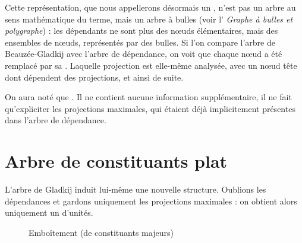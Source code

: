 Cette représentation, que nous appellerons désormais un , n’est pas un arbre au sens mathématique du terme, mais un arbre à bulles (voir l’ \textit{Graphe à bulles et polygraphe}) : les dépendants ne sont plus des nœuds élémentaires, mais des ensembles de nœuds, représentés par des bulles. Si l’on compare l’arbre de Beauzée-Gladkij avec l’arbre de dépendance, on voit que chaque nœud a été remplacé par sa . Laquelle projection est elle-même analysée, avec un nœud tête dont dépendent des projections, et ainsi de suite.

On aura noté que    . Il ne contient aucune information supplémentaire, il ne fait qu’expliciter les projections maximales, qui étaient déjà implicitement présentes dans l’arbre de dépendance.

\section{Arbre de constituants plat}\label{sec:3.4.2}

L’arbre de Gladkij induit lui-même une nouvelle structure. Oublions les dépendances et gardons uniquement les projections maximales : on obtient alors uniquement un  d’unités. 

\begin{figure}
\caption{\label{fig:laponie-box}Emboîtement (de constituants majeurs)}
\end{figure}

